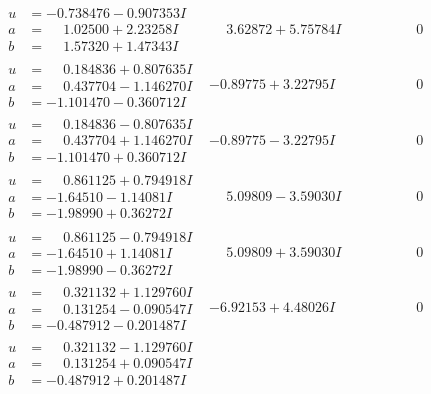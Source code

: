 \documentclass[1p]{elsarticle_modified}
\theoremstyle{definition}
\begin{document}
$$\begin{array}{c|c|c}
\begin{aligned}
u &= -0.738476 - 0.907353 I \\
a &= \phantom{-}1.02500 + 2.23258 I \\
b &= \phantom{-}1.57320 + 1.47343 I\end{aligned}
 & \phantom{-}3.62872 + 5.75784 I & \phantom{-0.000000 } 0 \\ \hline\begin{aligned}
u &= \phantom{-}0.184836 + 0.807635 I \\
a &= \phantom{-}0.437704 - 1.146270 I \\
b &= -1.101470 - 0.360712 I\end{aligned}
 & -0.89775 + 3.22795 I & \phantom{-0.000000 } 0 \\ \hline\begin{aligned}
u &= \phantom{-}0.184836 - 0.807635 I \\
a &= \phantom{-}0.437704 + 1.146270 I \\
b &= -1.101470 + 0.360712 I\end{aligned}
 & -0.89775 - 3.22795 I & \phantom{-0.000000 } 0 \\ \hline\begin{aligned}
u &= \phantom{-}0.861125 + 0.794918 I \\
a &= -1.64510 - 1.14081 I \\
b &= -1.98990 + 0.36272 I\end{aligned}
 & \phantom{-}5.09809 - 3.59030 I & \phantom{-0.000000 } 0 \\ \hline\begin{aligned}
u &= \phantom{-}0.861125 - 0.794918 I \\
a &= -1.64510 + 1.14081 I \\
b &= -1.98990 - 0.36272 I\end{aligned}
 & \phantom{-}5.09809 + 3.59030 I & \phantom{-0.000000 } 0 \\ \hline\begin{aligned}
u &= \phantom{-}0.321132 + 1.129760 I \\
a &= \phantom{-}0.131254 - 0.090547 I \\
b &= -0.487912 - 0.201487 I\end{aligned}
 & -6.92153 + 4.48026 I & \phantom{-0.000000 } 0 \\ \hline\begin{aligned}
u &= \phantom{-}0.321132 - 1.129760 I \\
a &= \phantom{-}0.131254 + 0.090547 I \\
b &= -0.487912 + 0.201487 I\end{aligned}

\end{array}$$
\end{document}
